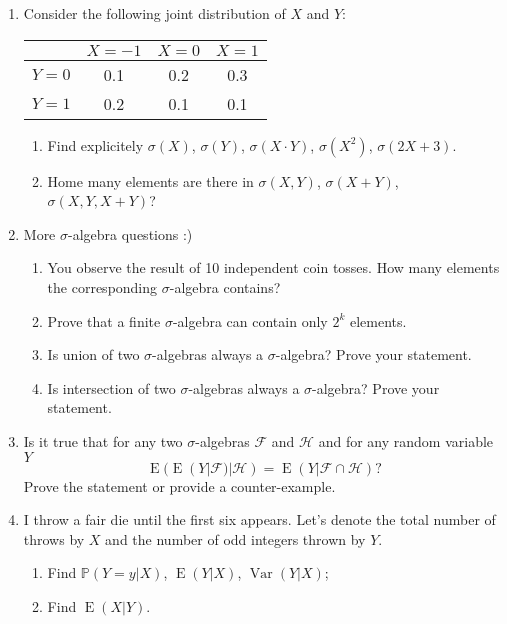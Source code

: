 \documentclass[12pt]{article}
\DeclareMathOperator{\Var}{Var}
\DeclareMathOperator{\E}{E}
\def \P{\mathbb{P}}
\begin{document}
\begin{enumerate}

\item 
  Consider the following joint distribution of $X$ and $Y$:

  \begin{tabular}{*{4}{c}}
  \toprule
  & $X=-1$ & $X=0$ & $X=1$ \\
  \midrule
  $Y=0$ & 0.1 & 0.2 & 0.3  \\
  $Y=1$ & 0.2 & 0.1 & 0.1  \\
  \bottomrule
  \end{tabular}
  
  \begin{enumerate}
   \item Find explicitely $\sigma(X)$, $\sigma(Y)$, $\sigma(X \cdot Y)$, $\sigma(X^2)$, $\sigma(2X+3)$.
   \item Home many elements are there in $\sigma(X, Y)$, $\sigma(X + Y)$, $\sigma(X, Y, X+Y)$?
  \end{enumerate}
  

\item More $\sigma$-algebra questions :)
\begin{enumerate}
  \item You observe the result of 10 independent coin tosses. How many elements the corresponding $\sigma$-algebra contains?
  \item Prove that a finite $\sigma$-algebra can contain only $2^k$ elements.
  \item Is union of two $\sigma$-algebras always a $\sigma$-algebra? Prove your statement.
  \item Is intersection of two $\sigma$-algebras always a $\sigma$-algebra? Prove your statement.
\end{enumerate}

\item 
Is it true that for any two $\sigma$-algebras $\mathcal{F}$ and $\mathcal{H}$ and for any random variable $Y$
\[
  \E(\E(Y|\mathcal F)|\mathcal H) = \E(Y|\mathcal F \cap \mathcal H)?
\]
Prove the statement or provide a counter-example.
\item I throw a fair die until the first six appears. 
Let's denote the total number of throws by $X$ and the number of odd integers thrown by $Y$.

\begin{enumerate}
  \item Find $\P(Y=y|X)$, $\E(Y|X)$, $\Var(Y|X)$;
  \item Find $\E(X|Y)$.
\end{enumerate}


\end{enumerate}
\end{document}
